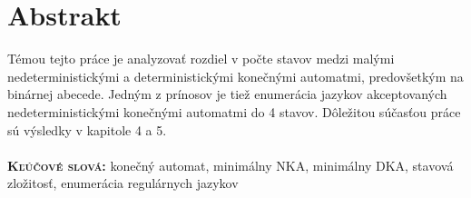 \chapter{Abstrakt}
Témou tejto práce je analyzovať rozdiel v počte stavov medzi malými nedeterministickými a deterministickými konečnými automatmi, predovšetkým na binárnej abecede. Jedným z prínosov je tiež enumerácia jazykov akceptovaných nedeterministickými konečnými automatmi do 4 stavov. Dôležitou súčasťou práce sú výsledky v kapitole 4 a 5.\\ \\
\textbf{\textsc{Kľúčové slová:}} konečný automat, minimálny NKA, minimálny DKA, stavová zložitosť, enumerácia regulárnych jazykov
